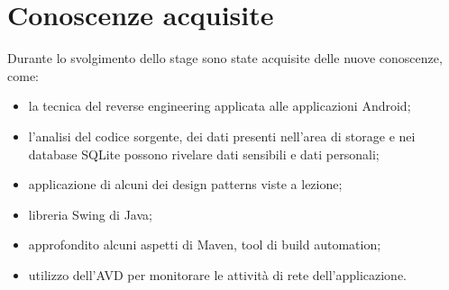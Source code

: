 
\section{Conoscenze acquisite}\label{sec:conoscenze-acquisite}
Durante lo svolgimento dello stage sono state acquisite delle nuove conoscenze, come:
\begin{itemize}
    \item la tecnica del reverse engineering applicata alle applicazioni Android;
    \item l'analisi del codice sorgente, dei dati presenti nell'area di storage e nei database SQLite possono rivelare dati sensibili e dati personali;
    \item applicazione di alcuni dei design patterns viste a lezione;
    \item libreria Swing di Java;
    \item approfondito alcuni aspetti di Maven, tool di build automation;
    \item utilizzo dell'AVD per monitorare le attività di rete dell'applicazione.
\end{itemize}
